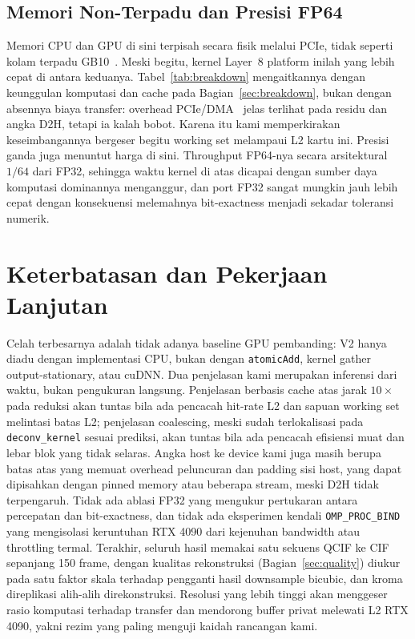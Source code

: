 \documentclass[conference]{IEEEtran}
\begin{document}
\subsection{Memori Non-Terpadu dan Presisi FP64}
Memori CPU dan GPU di sini terpisah secara fisik melalui PCIe, tidak seperti kolam terpadu GB10~\cite{nvidiagracehopper2022,wahlgren2025upm}. Meski begitu, kernel Layer~8 platform inilah yang lebih cepat di antara keduanya. Tabel~\ref{tab:breakdown} mengaitkannya dengan keunggulan komputasi dan cache pada Bagian~\ref{sec:breakdown}, bukan dengan absennya biaya transfer: overhead PCIe/DMA~\cite{go2017apunet} jelas terlihat pada residu dan angka D2H, tetapi ia kalah bobot. Karena itu kami memperkirakan keseimbangannya bergeser begitu working set melampaui L2 kartu ini. Presisi ganda juga menuntut harga di sini. Throughput FP64-nya secara arsitektural $1/64$ dari FP32, sehingga waktu kernel di atas dicapai dengan sumber daya komputasi dominannya menganggur, dan port FP32 sangat mungkin jauh lebih cepat dengan konsekuensi melemahnya bit-exactness menjadi sekadar toleransi numerik.

\section{Keterbatasan dan Pekerjaan Lanjutan}
\label{sec:limitations}
Celah terbesarnya adalah tidak adanya baseline GPU pembanding: V2 hanya diadu dengan implementasi CPU, bukan dengan \texttt{atomicAdd}, kernel gather output-stationary, atau cuDNN. Dua penjelasan kami merupakan inferensi dari waktu, bukan pengukuran langsung. Penjelasan berbasis cache atas jarak $10\times$ pada reduksi akan tuntas bila ada pencacah hit-rate L2 dan sapuan working set melintasi batas L2; penjelasan coalescing, meski sudah terlokalisasi pada \texttt{deconv\_kernel} sesuai prediksi, akan tuntas bila ada pencacah efisiensi muat dan lebar blok yang tidak selaras. Angka host ke device kami juga masih berupa batas atas yang memuat overhead peluncuran dan padding sisi host, yang dapat dipisahkan dengan pinned memory atau beberapa stream, meski D2H tidak terpengaruh. Tidak ada ablasi FP32 yang mengukur pertukaran antara percepatan dan bit-exactness, dan tidak ada eksperimen kendali \texttt{OMP\_PROC\_BIND} yang mengisolasi keruntuhan RTX 4090 dari kejenuhan bandwidth atau throttling termal. Terakhir, seluruh hasil memakai satu sekuens QCIF ke CIF sepanjang 150 frame, dengan kualitas rekonstruksi (Bagian~\ref{sec:quality}) diukur pada satu faktor skala terhadap pengganti hasil downsample bicubic, dan kroma direplikasi alih-alih direkonstruksi. Resolusi yang lebih tinggi akan menggeser rasio komputasi terhadap transfer dan mendorong buffer privat melewati L2 RTX 4090, yakni rezim yang paling menguji kaidah rancangan kami.
\end{document}
